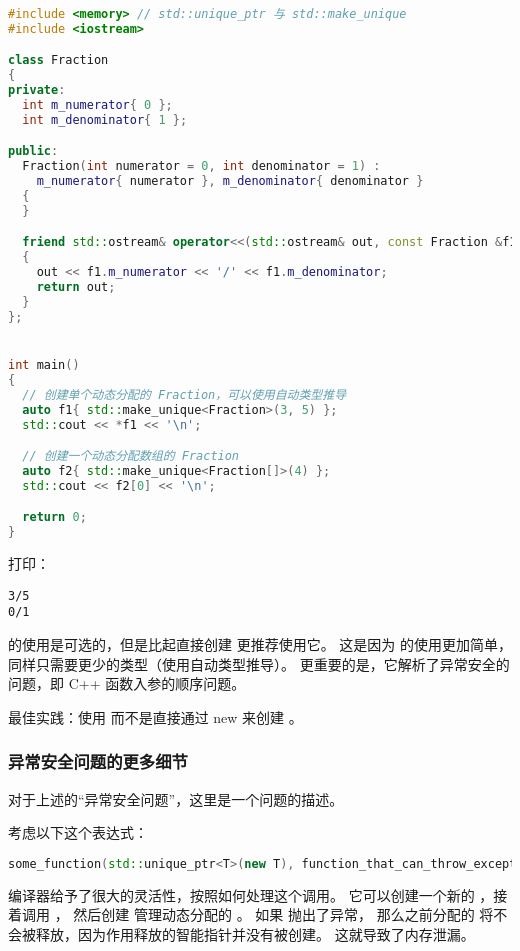 \documentclass[../../LearnCpp.tex]{subfiles}
\begin{document}
\begin{lstlisting}[language=C++]
#include <memory> // std::unique_ptr 与 std::make_unique
#include <iostream>

class Fraction
{
private:
  int m_numerator{ 0 };
  int m_denominator{ 1 };

public:
  Fraction(int numerator = 0, int denominator = 1) :
    m_numerator{ numerator }, m_denominator{ denominator }
  {
  }

  friend std::ostream& operator<<(std::ostream& out, const Fraction &f1)
  {
    out << f1.m_numerator << '/' << f1.m_denominator;
    return out;
  }
};


int main()
{
  // 创建单个动态分配的 Fraction，可以使用自动类型推导
  auto f1{ std::make_unique<Fraction>(3, 5) };
  std::cout << *f1 << '\n';

  // 创建一个动态分配数组的 Fraction
  auto f2{ std::make_unique<Fraction[]>(4) };
  std::cout << f2[0] << '\n';

  return 0;
}
\end{lstlisting}

打印：

\begin{lstlisting}
3/5
0/1
\end{lstlisting}

 的使用是可选的，但是比起直接创建  更推荐使用它。
这是因为  的使用更加简单，同样只需要更少的类型（使用自动类型推导）。
更重要的是，它解析了异常安全的问题，即 C++ 函数入参的顺序问题。

最佳实践：使用  而不是直接通过 new 来创建 。

\subsubsection*{异常安全问题的更多细节}

对于上述的“异常安全问题”，这里是一个问题的描述。

考虑以下这个表达式：

\begin{lstlisting}[language=C++]
some_function(std::unique_ptr<T>(new T), function_that_can_throw_exception());
\end{lstlisting}

编译器给予了很大的灵活性，按照如何处理这个调用。
它可以创建一个新的 ，接着调用 ，
然后创建  管理动态分配的 。
如果  抛出了异常，
那么之前分配的  将不会被释放，因为作用释放的智能指针并没有被创建。
这就导致了内存泄漏。
\end{document}
